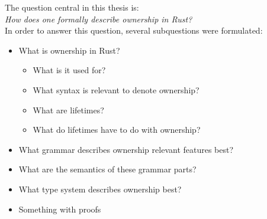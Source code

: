 
The question central in this thesis is: \\
\emph{How does one formally describe ownership in Rust?}\\

In order to answer this question, several subquestions were formulated: 

\begin{itemize}[noitemsep]
    \item What is ownership in Rust?
    \begin{itemize}[noitemsep]
        \item What is it used for?
        \item What syntax is relevant to denote ownership?
        \item What are lifetimes?
        \item What do lifetimes have to do with ownership?
    \end{itemize}
    \item What grammar describes ownership relevant features best?
    \item What are the semantics of these grammar parts?
    \item What type system describes ownership best?
    \item Something with proofs
\end{itemize}



